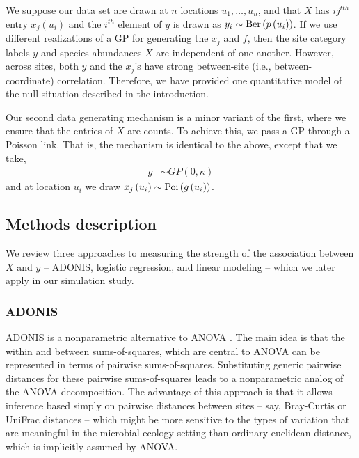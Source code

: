 \documentclass{article}
\begin{document}
We suppose our data set are drawn at $n$ locations $u_{1}, \dots, u_{n}$, and
that $X$ has $ij^{tth}$ entry $x_{j}\left(u_{i}\right)$ and the $i^{th}$ element
of $y$ is drawn as $y_{i} \sim \textnormal{Ber}\left(p\left(u_{i}\right)\right)$. If we use
different realizations of a GP for generating the $x_{j}$ and $f$, then the site
category labels $y$ and species abundances $X$ are independent of one another.
However, across sites, both $y$ and the $x_{j}$'s have strong between-site
(i.e., between-coordinate) correlation. Therefore, we have provided one
quantitative model of the null situation described in the introduction.

Our second data generating mechanism is a minor variant of the first, where
we ensure that the entries of $X$ are counts. To achieve this, we pass a GP
through a Poisson link. That is, the mechanism is identical to the above,
except that we take,
\begin{align}
  g &\sim GP\left(0, \kappa\right)
\end{align}
and at location $u_{i}$ we draw
$x_{j}\left(u_{i}\right) \sim \textnormal{Poi}\left(g\left(u_{i}\right)\right)$.

\subsection{Methods description}
\label{subsec:methods_description}

We review three approaches to measuring the strength of the association between
$X$ and $y$ -- ADONIS, logistic regression, and linear modeling -- which we
later apply in our simulation study.

\subsubsection{ADONIS}
\label{subsubsec:adonis}

ADONIS is a nonparametric alternative to ANOVA \citep{anderson2001new}. The main
idea is that the within and between sums-of-squares, which are central to ANOVA
can be represented in terms of pairwise sums-of-squares. Substituting generic
pairwise distances for these pairwise sums-of-squares leads to a nonparametric
analog of the ANOVA decomposition. The advantage of this approach is that it
allows inference based simply on pairwise distances between sites -- say,
Bray-Curtis or UniFrac distances -- which might be more sensitive to the types
of variation that are meaningful in the microbial ecology setting than ordinary
euclidean distance, which is implicitly assumed by ANOVA.
\end{document}
